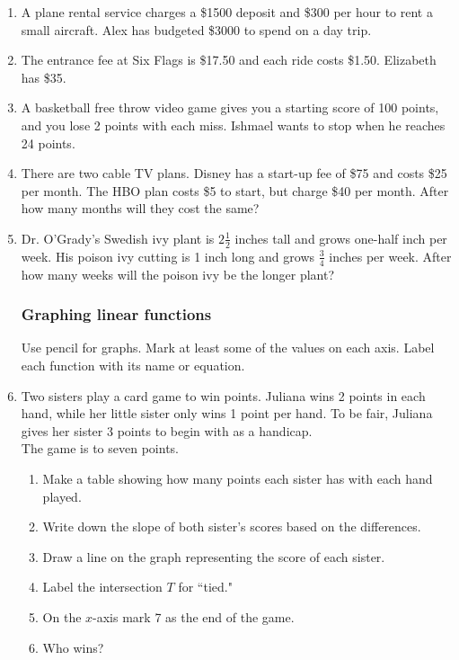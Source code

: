 \documentclass[12pt, oneside]{article}
\begin{document}
\begin{enumerate}
  \item A plane rental service charges a \$1500 deposit and \$300 per hour to rent a small aircraft. Alex has budgeted \$3000 to spend on a day trip.

\newpage
  \item The entrance fee at Six Flags is \$17.50 and each ride costs \$1.50. Elizabeth has \$35. \vspace{8cm}

  \item A basketball free throw video game gives you a starting score of 100 points, and you lose 2 points with each miss. Ishmael wants to stop when he reaches 24 points.

\newpage
  \item There are two cable TV plans. Disney has a start-up fee of \$75 and costs \$25 per month. The HBO plan costs \$5 to start, but charge \$40 per month. After how many months will they cost the same?  \vspace{8cm}

  \item Dr. O'Grady's Swedish ivy plant is $2 \frac{1}{2}$ inches tall and grows one-half inch per week. His poison ivy cutting is 1 inch long and grows $\frac{3}{4}$ inches per week. After how many weeks will the poison ivy be the longer plant?

\newpage
\subsubsection*{Graphing linear functions}
Use pencil for graphs. Mark at least some of the values on each axis. Label each function with its name or equation.
\item Two sisters play a card game to win points. Juliana wins 2 points in each hand, while her little sister only wins 1 point per hand. To be fair, Juliana gives her sister 3 points to begin with as a handicap. \\
The game is to seven points.
  \begin{enumerate}
      \item Make a table showing how many points each sister has with each hand played. \bigskip
      \item Write down the slope of both sister's scores based on the differences. \bigskip
      \item Draw a line on the graph representing the score of each sister.
      \item Label the intersection $T$ for ``tied."
      \item On the $x$-axis mark 7 as the end of the game.
      \item Who wins? \bigskip
  \end{enumerate}


\end{enumerate}
\end{document}
